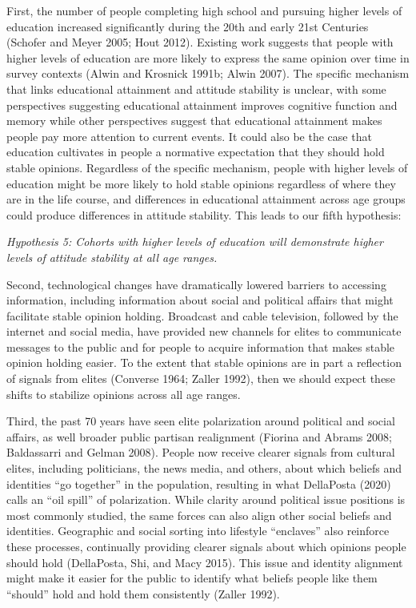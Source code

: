 \documentclass[
  12pt,
]{article}
\begin{document}
First, the number of people completing high school and pursuing higher levels of education increased significantly during the 20th and early 21st Centuries (Schofer and Meyer 2005; Hout 2012). Existing work suggests that people with higher levels of education are more likely to express the same opinion over time in survey contexts (Alwin and Krosnick 1991b; Alwin 2007). The specific mechanism that links educational attainment and attitude stability is unclear, with some perspectives suggesting educational attainment improves cognitive function and memory while other perspectives suggest that educational attainment makes people pay more attention to current events. It could also be the case that education cultivates in people a normative expectation that they should hold stable opinions. Regardless of the specific mechanism, people with higher levels of education might be more likely to hold stable opinions regardless of where they are in the life course, and differences in educational attainment across age groups could produce differences in attitude stability. This leads to our fifth hypothesis:

\emph{Hypothesis 5: Cohorts with higher levels of education will demonstrate higher levels of attitude stability at all age ranges.}

Second, technological changes have dramatically lowered barriers to accessing information, including information about social and political affairs that might facilitate stable opinion holding. Broadcast and cable television, followed by the internet and social media, have provided new channels for elites to communicate messages to the public and for people to acquire information that makes stable opinion holding easier. To the extent that stable opinions are in part a reflection of signals from elites (Converse 1964; Zaller 1992), then we should expect these shifts to stabilize opinions across all age ranges.

Third, the past 70 years have seen elite polarization around political and social affairs, as well broader public partisan realignment (Fiorina and Abrams 2008; Baldassarri and Gelman 2008). People now receive clearer signals from cultural elites, including politicians, the news media, and others, about which beliefs and identities ``go together'' in the population, resulting in what DellaPosta (2020) calls an ``oil spill'' of polarization. While clarity around political issue positions is most commonly studied, the same forces can also align other social beliefs and identities. Geographic and social sorting into lifestyle ``enclaves'' also reinforce these processes, continually providing clearer signals about which opinions people should hold (DellaPosta, Shi, and Macy 2015). This issue and identity alignment might make it easier for the public to identify what beliefs people like them ``should'' hold and hold them consistently (Zaller 1992).
\end{document}
